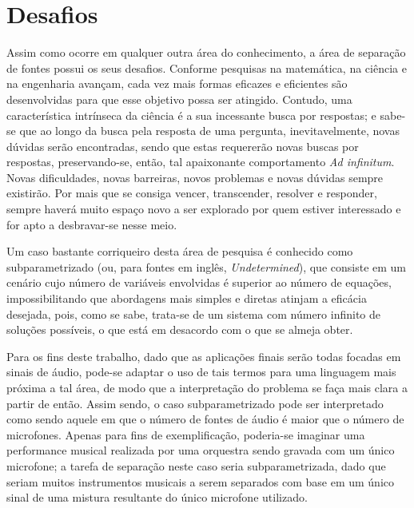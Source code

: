 


\section{Desafios}
\label{sec:intro_challenges}

Assim como ocorre em qualquer outra área do conhecimento, a área de separação de fontes possui os seus desafios. Conforme pesquisas na matemática, na ciência e na engenharia avançam, cada vez mais formas eficazes e eficientes são desenvolvidas para que esse objetivo possa ser atingido. Contudo, uma característica intrínseca da ciência é a sua incessante busca por respostas; e sabe-se que ao longo da busca pela resposta de uma pergunta, inevitavelmente, novas dúvidas serão encontradas, sendo que estas requererão novas buscas por respostas, preservando-se, então, tal apaixonante comportamento \textit{Ad infinitum}. Novas dificuldades, novas barreiras, novos problemas e novas dúvidas sempre existirão. Por mais que se consiga vencer, transcender, resolver e responder, sempre haverá muito espaço novo a ser explorado por quem estiver interessado e for apto a desbravar-se nesse meio.




Um caso bastante corriqueiro desta área de pesquisa é conhecido como subparametrizado (ou, para fontes em inglês, \textit{Undetermined}), que consiste em um cenário cujo número de variáveis envolvidas é superior ao número de equações, impossibilitando que abordagens mais simples e diretas atinjam a eficácia desejada, pois, como se sabe, trata-se de um sistema com número infinito de soluções possíveis, o que está em desacordo com o que se almeja obter.

Para os fins deste trabalho, dado que as aplicações finais serão todas focadas em sinais de áudio, pode-se adaptar o uso de tais termos para uma linguagem mais próxima a tal área, de modo que a interpretação do problema se faça mais clara a partir de então. Assim sendo, o caso subparametrizado pode ser interpretado como sendo aquele em que o número de fontes de áudio é maior que o número de microfones. Apenas para fins de exemplificação, poderia-se imaginar uma performance musical realizada por uma orquestra sendo gravada com um único microfone; a tarefa de separação neste caso seria subparametrizada, dado que seriam muitos instrumentos musicais a serem separados com base em um único sinal de uma mistura resultante do único microfone utilizado.




